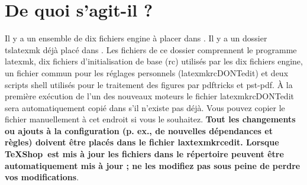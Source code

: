\documentclass[11pt,french]{article}
\newcommand{\TS}{\textsf{\TeX Shop}}
\newcommand{\latexmk}{\textsf{latexmk}}
\newcommand{\cmd}[1]{\textsf{#1}}
\begin{document}

%

\section{De quoi s'agit-il ?}

Il y a un ensemble de dix fichiers \cmd{engine} à placer dans . Il y a un dossier \cmd{tslatexmk} déjà placé dans . Les fichiers de ce dossier comprennent le programme \cmd{latexmk}, dix fichiers d'initialisation de base (\cmd{rc}) utilisés par les dix fichiers \cmd{engine}, un fichier commun pour les réglages personnels (\cmd{latexmkrcDONTedit}) et deux scripts shell utilisés pour le traitement des figures par \cmd{pdftricks} et \cmd{pst-pdf}. À la première exécution de l'un des nouveaux moteurs le fichier \cmd{latexmkrcDONTedit} sera automatiquement copié dans  s'il  n'existe pas déjà. Vous pouvez copier le fichier manuellement à cet endroit si vous le souhaitez. \textbf{Tout les changements ou ajouts à la configuration (p. ex., de nouvelles dépendances et règles) doivent être placés dans le fichier \cmd{laxtexmkrcedit}. Lorsque \TS\ est mis à jour les fichiers dans le répertoire  peuvent être automatiquement mis à jour ; ne les modifiez pas sous peine de perdre vos modifications}.
\end{document}
